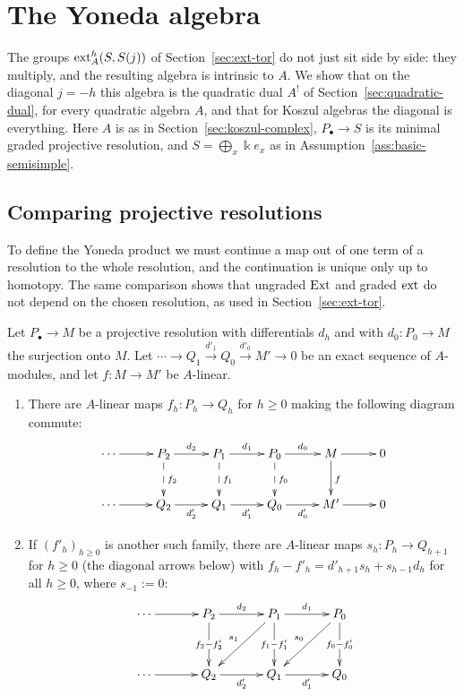 \clearpage
\section{The Yoneda algebra}\label{sec:yoneda}

The groups $\operatorname{ext}\nolimits_A^h(S,S(j))$ of Section~\ref{sec:ext-tor} do not just sit side by side: they multiply, and the resulting algebra is intrinsic to $A$.
We show that on the diagonal $j=-h$ this algebra is the quadratic dual $A^!$ of Section~\ref{sec:quadratic-dual}, for every quadratic algebra $A$, and that for Koszul algebras the diagonal is everything.
Here $A$ is as in Section~\ref{sec:koszul-complex}, $P_\bullet\to S$ is its minimal graded projective resolution, and $S=\bigoplus_x\Bbbk e_x$ as in Assumption~\ref{ass:basic-semisimple}.

\subsection{Comparing projective resolutions}\label{subsec:comparison}

To define the Yoneda product we must continue a map out of one term of a resolution to the whole resolution, and the continuation is unique only up to homotopy.
The same comparison shows that ungraded $\operatorname{Ext}\nolimits$ and graded $\operatorname{ext}\nolimits$ do not depend on the chosen resolution, as used in Section~\ref{sec:ext-tor}.

\begin{lemma}\label{lem:comparison}
Let $P_\bullet\to M$ be a projective resolution with differentials $d_h$ and with $d_0:P_0\to M$ the surjection onto $M$.
Let $\cdots\to Q_1\xrightarrow{d'_1}Q_0\xrightarrow{d'_0}M'\to0$ be an exact sequence of $A$-modules, and let $f:M\to M'$ be $A$-linear.
\begin{enumerate}
\item There are $A$-linear maps $f_h:P_h\to Q_h$ for $h\geq0$ making the following diagram commute:
\[
\xymatrix@C=26pt@R=26pt{
\cdots\ar[r]&P_2\ar[r]^{d_2}\ar@{-->}[d]^{f_2}&P_1\ar[r]^{d_1}\ar@{-->}[d]^{f_1}&P_0\ar[r]^{d_0}\ar@{-->}[d]^{f_0}&M\ar[r]\ar[d]^{f}&0\\
\cdots\ar[r]&Q_2\ar[r]_{d'_2}&Q_1\ar[r]_{d'_1}&Q_0\ar[r]_{d'_0}&M'\ar[r]&0
}
\]
\item If $(f'_h)_{h\geq0}$ is another such family, there are $A$-linear maps $s_h:P_h\to Q_{h+1}$ for $h\geq0$ (the diagonal arrows below) with $f_h-f'_h=d'_{h+1}s_h+s_{h-1}d_h$ for all $h\geq0$, where $s_{-1}:=0$:
\[
\xymatrix@C=34pt@R=34pt{
\cdots\ar[r]&P_2\ar[r]^{d_2}\ar[d]|{f_2-f'_2}&P_1\ar[r]^{d_1}\ar[d]|{f_1-f'_1}\ar[dl]_{s_1}&P_0\ar[d]|{f_0-f'_0}\ar[dl]_{s_0}\\
\cdots\ar[r]&Q_2\ar[r]_{d'_2}&Q_1\ar[r]_{d'_1}&Q_0
}
\]
\end{enumerate}
\end{lemma}


